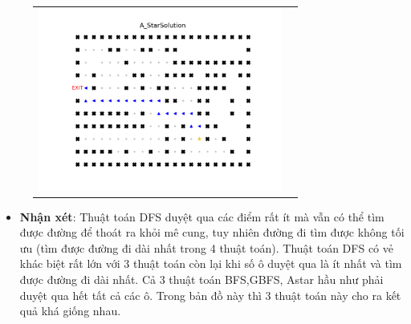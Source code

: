 \documentclass[11pt]{scrartcl} %
\begin{document}
\begin{itemize}
\begin{figure}[h]
\begin{tabular}{cc}
				\includegraphics[width=8cm]{Figures/fg1_astar.png}
			\end{tabular}
		\end{figure}
		\begin{itemize}
			\item \textbf{Nhận xét}: Thuật toán DFS duyệt qua các điểm rất ít mà vẫn có thể tìm được đường để thoát ra khỏi mê cung, tuy nhiên đường đi tìm được không tối ưu (tìm được đường đi dài nhất trong 4 thuật toán). Thuật toán DFS có vẻ khác biệt rất lớn với 3 thuật toán còn lại khi số ô duyệt qua là ít nhất và tìm được đường đi dài nhất. Cả 3 thuật toán BFS,GBFS, Astar hầu như phải duyệt qua hết tất cả các ô. Trong bản đồ này thì 3 thuật toán này cho ra kết quả khá giống nhau.
		\end{itemize}
	

\end{itemize}
\end{document}
